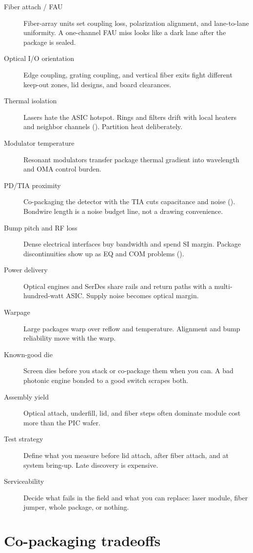 \begin{description}
\item[Fiber attach / FAU] Fiber-array units set coupling loss, polarization
      alignment, and lane-to-lane uniformity. A one-channel FAU miss looks
      like a dark lane after the package is sealed.
\item[Optical I/O orientation] Edge coupling, grating coupling, and vertical
      fiber exits fight different keep-out zones, lid designs, and board
      clearances.
\item[Thermal isolation] Lasers hate the ASIC hotspot. Rings and filters
      drift with local heaters and neighbor channels
      (). Partition heat deliberately.
\item[Modulator temperature] Resonant modulators transfer package thermal
      gradient into wavelength and OMA control burden.
\item[PD/TIA proximity] Co-packaging the detector with the TIA cuts
      capacitance and noise (). Bondwire length is a noise
      budget line, not a drawing convenience.
\item[Bump pitch and RF loss] Dense electrical interfaces buy bandwidth and
      spend SI margin. Package discontinuities show up as EQ and COM
      problems ().
\item[Power delivery] Optical engines and SerDes share rails and return
      paths with a multi-hundred-watt ASIC. Supply noise becomes optical
      margin.
\item[Warpage] Large packages warp over reflow and temperature. Alignment
      and bump reliability move with the warp.
\item[Known-good die] Screen dies before you stack or co-package them when
      you can. A bad photonic engine bonded to a good switch scrapes both.
\item[Assembly yield] Optical attach, underfill, lid, and fiber steps often
      dominate module cost more than the PIC wafer.
\item[Test strategy] Define what you measure before lid attach, after fiber
      attach, and at system bring-up. Late discovery is expensive.
\item[Serviceability] Decide what fails in the field and what you can
      replace: laser module, fiber jumper, whole package, or nothing.
\end{description}

\section{Co-packaging tradeoffs}
\label{sec:pkg-cpo-tradeoffs}

